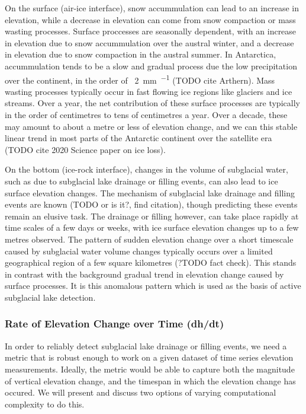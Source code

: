 On the surface (air-ice interface), snow accummulation can lead to an increase in elevation, while a decrease in elevation can come from snow compaction or mass wasting processes.
Surface proccesses are seasonally dependent, with an increase in elevation due to snow accummulation over the austral winter, and a decrease in elevation due to snow compaction in the austral summer.
In Antarctica, accummulation tends to be a slow and gradual process due the low precipitation over the continent, in the order of ~\SI{2}{\milli\metre\per\year} (TODO cite Arthern).
Mass wasting processes typically occur in fast flowing ice regions like glaciers and ice streams.
Over a year, the net contribution of these surface processes are typically in the order of centimetres to tens of centimetres a year.
Over a decade, these may amount to about a metre or less of elevation change, and we can this stable linear trend in most parts of the Antarctic continent over the satellite era (TODO cite 2020 Science paper on ice loss).


On the bottom (ice-rock interface), changes in the volume of subglacial water, such as due to subglacial lake drainage or filling events, can also lead to ice surface elevation changes.
The mechanism of subglacial lake drainage and filling events are known (TODO or is it?, find citation), though predicting these events remain an elusive task.
The drainage or filling however, can take place rapidly at time scales of a few days or weeks, with ice surface elevation changes up to a few metres observed.
The pattern of sudden elevation change over a short timescale caused by subglacial water volume changes typically occurs over a limited geographical region of a few square kilometres (?TODO fact check).
This stands in contrast with the background gradual trend in elevation change caused by surface processes.
It is this anomalous pattern which is used as the basis of active subglacial lake detection.

\subsubsection{Rate of Elevation Change over Time (dh/dt)}

In order to reliably detect subglacial lake drainage or filling events, we need a metric that is robust enough to work on a given dataset of time series elevation measurements.
Ideally, the metric would be able to capture both the magnitude of vertical elevation change, and the timespan in which the elevation change has occured.
We will present and discuss two options of varying computational complexity to do this.

